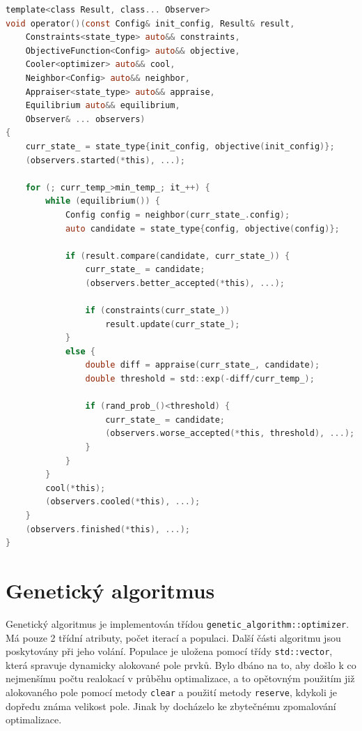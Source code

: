 \begin{lstlisting}[caption={~Implementace simulovaného ochlazování},label={lst:simulated:annealing},captionpos=t,abovecaptionskip=-\medskipamount,belowcaptionskip=\medskipamount,language=C]
template<class Result, class... Observer>
void operator()(const Config& init_config, Result& result,
    Constraints<state_type> auto&& constraints,
    ObjectiveFunction<Config> auto&& objective,
    Cooler<optimizer> auto&& cool,
    Neighbor<Config> auto&& neighbor,
    Appraiser<state_type> auto&& appraise,
    Equilibrium auto&& equilibrium,
    Observer& ... observers)
{
    curr_state_ = state_type{init_config, objective(init_config)};
    (observers.started(*this), ...);

    for (; curr_temp_>min_temp_; it_++) {
        while (equilibrium()) {
            Config config = neighbor(curr_state_.config);
            auto candidate = state_type{config, objective(config)};

            if (result.compare(candidate, curr_state_)) {
                curr_state_ = candidate;
                (observers.better_accepted(*this), ...);

                if (constraints(curr_state_))
                    result.update(curr_state_);
            }
            else {
                double diff = appraise(curr_state_, candidate);
                double threshold = std::exp(-diff/curr_temp_);

                if (rand_prob_()<threshold) {
                    curr_state_ = candidate;
                    (observers.worse_accepted(*this, threshold), ...);
                }
            }
        }
        cool(*this);
        (observers.cooled(*this), ...);
    }
    (observers.finished(*this), ...);
}
\end{lstlisting}

\section{Genetický algoritmus}
Genetický algoritmus je implementován třídou \texttt{genetic\_algorithm::optimizer}.
Má pouze 2 třídní atributy, počet iterací a populaci.
Další části algoritmu jsou poskytovány při jeho volání.
Populace je uložena pomocí třídy \texttt{std::vector}, která spravuje dynamicky alokované pole prvků.
Bylo dbáno na to, aby došlo k co nejmenšímu počtu realokací v průběhu optimalizace, a to opětovným použitím již alokovaného pole pomocí metody \texttt{clear} a použití metody \texttt{reserve}, kdykoli je dopředu známa velikost pole.
Jinak by docházelo ke zbytečnému zpomalování optimalizace.

